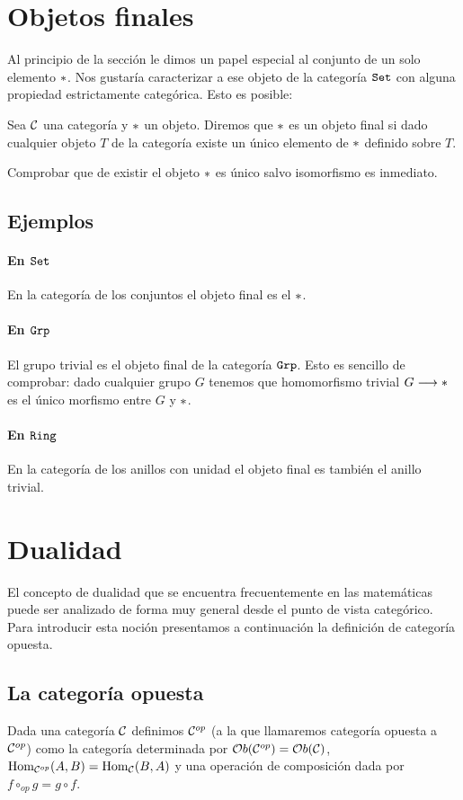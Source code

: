 \section{Objetos finales}
Al principio de la sección le dimos un papel especial al conjunto
de un solo elemento $*$. Nos gustaría caracterizar a ese objeto de
la categoría $\texttt{Set}$ con alguna propiedad estrictamente categórica.
Esto es posible:

\begin{definition}
Sea $\mathcal{C}$ una categoría y $*$ un objeto. Diremos que $*$ es un objeto
final si dado cualquier objeto $T$ de la categoría existe un
único elemento de $*$ definido sobre $T$.
\end{definition}

Comprobar que de existir el objeto $*$ es único salvo isomorfismo
es inmediato.
\subsection{Ejemplos}
\paragraph{En $\texttt{Set}$}
En la categoría de los conjuntos el objeto final es el $*$.

\paragraph{En $\texttt{Grp}$}
El grupo trivial es el objeto final de la categoría $\texttt{Grp}$.
Esto es sencillo de comprobar: dado cualquier grupo $G$ tenemos
que homomorfismo trivial $G\longrightarrow *$ es el único morfismo
entre $G$ y $*$.

\paragraph{En $\texttt{Ring}$}
En la categoría de los anillos con unidad el objeto final es
también el anillo trivial.

\section{Dualidad}
El concepto de dualidad que se encuentra frecuentemente en las
matemáticas puede ser analizado de forma muy general desde el punto
de vista categórico. Para introducir esta noción presentamos a
continuación la definición de categoría opuesta.

\subsection{La categoría opuesta}
\begin{definition}
Dada una categoría $\mathcal{C}$ definimos
$\mathcal{C}^{op}$ (a la que llamaremos categoría opuesta a $\mathcal{C}^{op}$)
como la categoría determinada por $\mathcal{O}b(\mathcal{C}^{op}) = \mathcal{O}b(\mathcal{C})$,
$\operatorname{Hom}_{\mathcal{C}^{op}}(A, B) = \operatorname{Hom}_{\mathcal{C}}(B, A)$ y una operación de
composición dada por $f \circ_{op} g = g \circ f$.
\end{definition}

